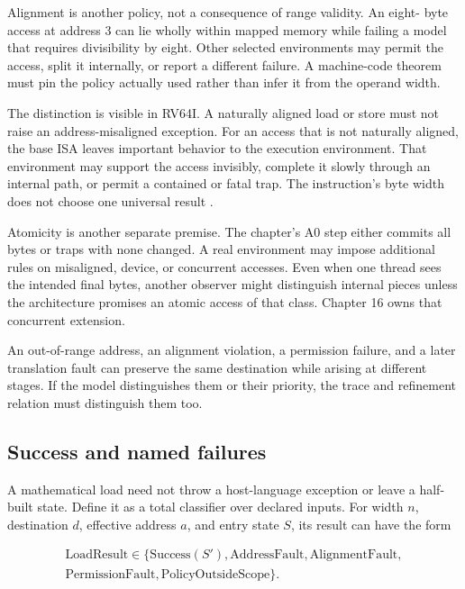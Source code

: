 Alignment is another policy, not a consequence of range validity. An eight-
byte access at address 3 can lie wholly within mapped memory while failing a
model that requires divisibility by eight. Other selected environments may
permit the access, split it internally, or report a different failure. A
machine-code theorem must pin the policy actually used rather than infer it
from the operand width.

The distinction is visible in RV64I. A naturally aligned load or store must
not raise an address-misaligned exception. For an access that is not naturally
aligned, the base ISA leaves important behavior to the execution environment.
That environment may support the access invisibly, complete it slowly through
an internal path, or permit a contained or fatal trap. The instruction's byte
width does not choose one universal result \autocite{riscv2026unpriv}.

Atomicity is another separate premise. The chapter's A0 step either commits
all bytes or traps with none changed. A real environment may impose additional
rules on misaligned, device, or concurrent accesses. Even when one thread sees
the intended final bytes, another observer might distinguish internal pieces
unless the architecture promises an atomic access of that class. Chapter 16
owns that concurrent extension.

\begin{warning}[title={Do not merge all memory failures}]
An out-of-range address, an alignment violation, a permission failure, and a
later translation fault can preserve the same destination while arising at
different stages. If the model distinguishes them or their priority, the
trace and refinement relation must distinguish them too.
\end{warning}

\subsection{Success and named failures}

A mathematical load need not throw a host-language exception or leave a
half-built state. Define it as a total classifier over declared inputs. For
width \(n\), destination \(d\), effective address \(a\), and entry state \(S\),
its result can have the form

\[
  \begin{array}{c}
  \mathrm{LoadResult}\in
  \{\mathrm{Success}(S'),\mathrm{AddressFault},\mathrm{AlignmentFault},\\
  \mathrm{PermissionFault},\mathrm{PolicyOutsideScope}\}.
  \end{array}
\]

